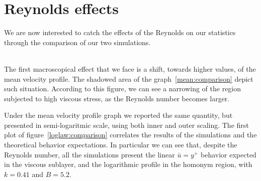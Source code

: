 \section{Reynolds effects}
We are now interested to catch the effects of the Reynolds on our statistics through the comparison of our two simulations.\\~\par
The first macroscopical effect that we face is a shift, towards higher values, of the mean velocity profile. The shadowed area of the graph~\ref{mean:comparison} depict such situation. According to this figure, we can see a narrowing of the region subjected to high viscous stress, as the Reynolds number becomes larger.\par
Under the mean velocity profile graph we reported the same quantity, but presented in semi-logaritmic scale, using both inner and outer scaling.
The first plot of figure~\ref{loglaw:comparison} correlates the results of the simulations and the theoretical behavior expectations.
In particular we can see that, despite the Reynolds number, all the simulations present the linear $\bar{u}=y^{+}$ behavior expected in the viscous sublayer, and the logarithmic profile in the homonym region, with $k=0.41$ and $B=5.2$.\\~\par

